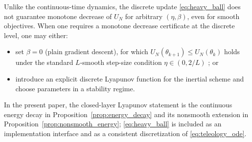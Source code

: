 Unlike the continuous-time dynamics, the discrete update \eqref{eq:heavy_ball} does not guarantee monotone decrease of $U_N$ for arbitrary $(\eta,\beta)$, even for smooth objectives.
When one requires a monotone decrease certificate at the discrete level, one may either:
\begin{itemize}
\item set $\beta=0$ (plain gradient descent), for which $U_N(\theta_{k+1})\le U_N(\theta_k)$ holds under the standard $L$-smooth step-size condition $\eta\in(0,2/L)$ \cite{Nesterov2004}; or
\item introduce an explicit discrete Lyapunov function for the inertial scheme and choose parameters in a stability regime.
\end{itemize}
In the present paper, the closed-layer Lyapunov statement is the continuous energy decay in Proposition~\ref{prop:energy_decay} and its nonsmooth extension in Proposition~\ref{prop:nonsmooth_energy}; \eqref{eq:heavy_ball} is included as an implementation interface and as a consistent discretization of \eqref{eq:teleology_ode}.


